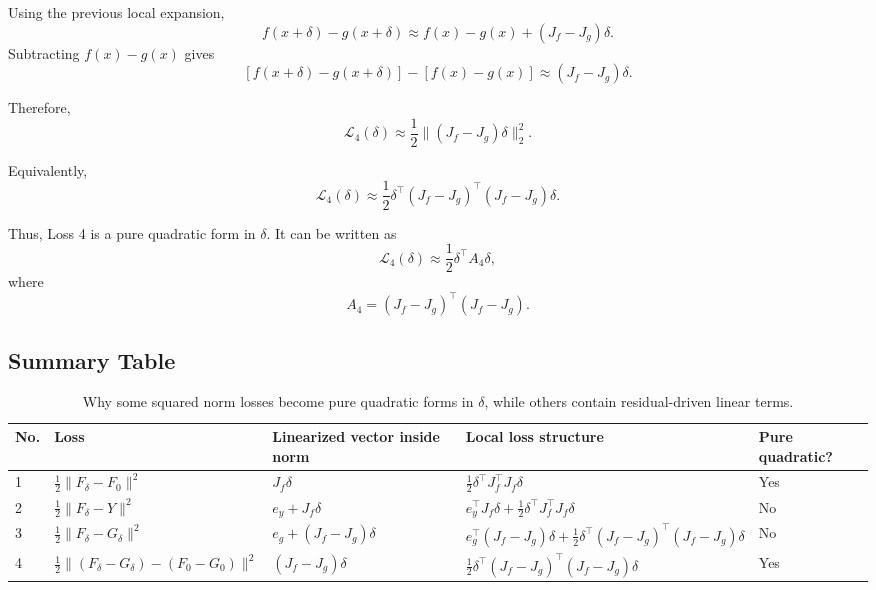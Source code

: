 \documentclass{article}
\begin{document}
Using the previous local expansion,
\[
    f(x+\delta)-g(x+\delta)
    \approx
    f(x)-g(x)+(J_f-J_g)\delta.
\]
Subtracting \(f(x)-g(x)\) gives
\[
    [f(x+\delta)-g(x+\delta)]-[f(x)-g(x)]
    \approx
    (J_f-J_g)\delta.
\]

Therefore,
\[
    \mathcal L_4(\delta)
    \approx
    \frac{1}{2}
    \|(J_f-J_g)\delta\|_2^2.
\]

Equivalently,
\[
    \mathcal L_4(\delta)
    \approx
    \frac{1}{2}
    \delta^\top
    (J_f-J_g)^\top(J_f-J_g)
    \delta.
\]

Thus, Loss 4 is a pure quadratic form in \(\delta\). It can be written as
\[
    \mathcal L_4(\delta)
    \approx
    \frac{1}{2}\delta^\top A_4\delta,
\]
where
\[
    A_4=(J_f-J_g)^\top(J_f-J_g).
\]

\subsection{Summary Table}

\begin{table}[h]
\centering
\begin{tabular}{p{0.8cm} p{4.2cm} p{4.2cm} p{4.8cm} p{2.2cm}}
\hline
No. & Loss & Linearized vector inside norm & Local loss structure & Pure quadratic? \\
\hline
1 &
\(\displaystyle \frac{1}{2}\|F_\delta-F_0\|^2\)
&
\(\displaystyle J_f\delta\)
&
\(\displaystyle \frac{1}{2}\delta^\top J_f^\top J_f\delta\)
&
Yes
\\[1.2em]

2 &
\(\displaystyle \frac{1}{2}\|F_\delta-Y\|^2\)
&
\(\displaystyle e_y+J_f\delta\)
&
\(\displaystyle e_y^\top J_f\delta+\frac{1}{2}\delta^\top J_f^\top J_f\delta\)
&
No
\\[1.2em]

3 &
\(\displaystyle \frac{1}{2}\|F_\delta-G_\delta\|^2\)
&
\(\displaystyle e_g+(J_f-J_g)\delta\)
&
\(\displaystyle e_g^\top(J_f-J_g)\delta+\frac{1}{2}\delta^\top(J_f-J_g)^\top(J_f-J_g)\delta\)
&
No
\\[1.2em]

4 &
\(\displaystyle \frac{1}{2}\|(F_\delta-G_\delta)-(F_0-G_0)\|^2\)
&
\(\displaystyle (J_f-J_g)\delta\)
&
\(\displaystyle \frac{1}{2}\delta^\top(J_f-J_g)^\top(J_f-J_g)\delta\)
&
Yes
\\
\hline
\end{tabular}
\caption{Why some squared norm losses become pure quadratic forms in \(\delta\), while others contain residual-driven linear terms.}
\end{table}
\end{document}
